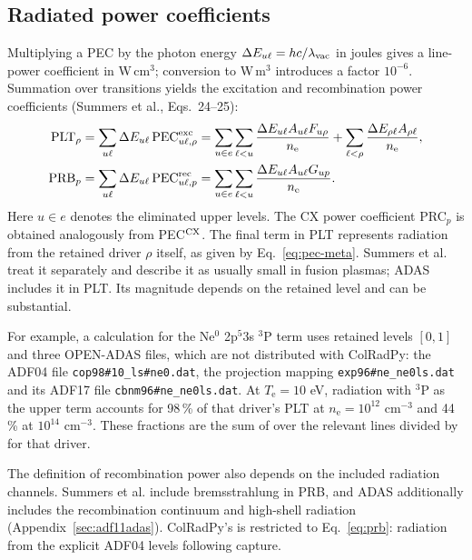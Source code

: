 \documentclass[11pt,a4paper]{article}
\newcommand{\code}[1]{\texttt{\detokenize{#1}}}
\newcommand{\nelec}{n_{\mathrm e}}
\newcommand{\Te}{T_{\mathrm e}}
\numberwithin{equation}{section}
\begin{document}
\subsection{Radiated power coefficients}

Multiplying a PEC by the photon energy
$\Delta E_{u\ell}=hc/\lambda_{\rm vac}$ in joules gives a line-power
coefficient in W\,cm$^3$; conversion to W\,m$^3$ introduces a factor
$10^{-6}$. Summation over transitions yields the excitation and
recombination power coefficients (Summers et al., Eqs.~24--25):
\begin{align}
 \mathrm{PLT}_\rho&=\sum_{u\ell}\Delta E_{u\ell}\,\mathrm{PEC}^{\rm exc}_{u\ell,\rho}
   =\sum_{u\in e}\sum_{\ell<u}\frac{\Delta E_{u\ell}A_{u\ell}F_{u\rho}}{\nelec}
    +\sum_{\ell<\rho}\frac{\Delta E_{\rho\ell}A_{\rho\ell}}{\nelec},\label{eq:plt}\\
 \mathrm{PRB}_p&=\sum_{u\ell}\Delta E_{u\ell}\,\mathrm{PEC}^{\rm rec}_{u\ell,p}
   =\sum_{u\in e}\sum_{\ell<u}\frac{\Delta E_{u\ell}A_{u\ell}G_{up}}{\nelec}.\label{eq:prb}
\end{align}
Here $u\in e$ denotes the eliminated upper levels. The CX power
coefficient PRC$_p$ is obtained analogously from PEC$^{\rm CX}$.
The final term in PLT represents radiation from the retained driver
$\rho$ itself, as given by Eq.~\eqref{eq:pec-meta}. Summers et al.
treat it separately and describe it as usually small in fusion plasmas;
ADAS includes it in PLT. Its magnitude depends on the retained level
and can be substantial.

For example, a calculation for the Ne$^0$ 2p$^5$3s $^3$P term uses
retained levels $[0,1]$ and three OPEN-ADAS files, which are not
distributed with ColRadPy: the ADF04 file \texttt{cop98\#10\_ls\#ne0.dat},
the projection mapping \texttt{exp96\#ne\_ne0ls.dat} and its ADF17 file
\texttt{cbnm96\#ne\_ne0ls.dat}. At $\Te=10$ eV, radiation with $^3$P
as the upper term accounts for 98\,\% of that driver's PLT at
$\nelec=10^{12}$ cm$^{-3}$ and 44\,\% at $10^{14}$ cm$^{-3}$.
These fractions are the sum of \code{pls} over the relevant lines
divided by \code{plt} for that driver.

The definition of recombination power also depends on the included
radiation channels. Summers et al. include bremsstrahlung in PRB,
and ADAS additionally includes the recombination continuum and
high-shell radiation (Appendix~\ref{sec:adf11adas}). ColRadPy's
\code{prb} is restricted to Eq.~\eqref{eq:prb}: radiation from the
explicit ADF04 levels following capture.
\end{document}
